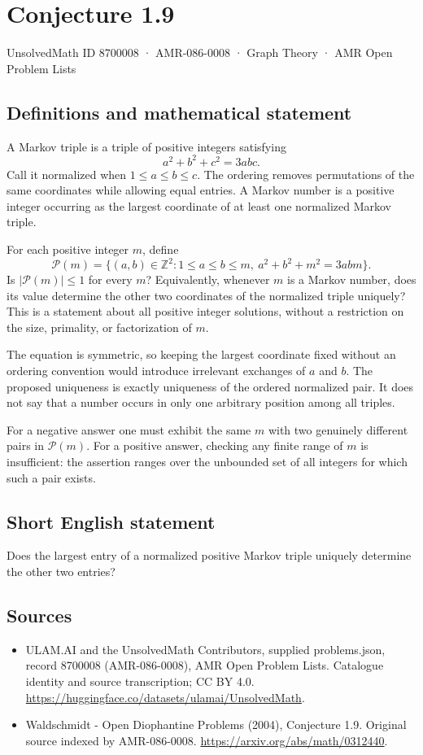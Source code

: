 \documentclass[11pt,a4paper]{article}
\begin{document}
\section*{Conjecture 1.9}\label{8700008}
{\small UnsolvedMath ID 8700008 · AMR-086-0008 · Graph Theory · AMR Open Problem Lists}
\subsection{Definitions and mathematical statement}
A Markov triple is a triple of positive integers satisfying
\[
a^2+b^2+c^2=3abc.
\]
Call it normalized when $1\le a\le b\le c$. The ordering removes permutations of the same coordinates while allowing equal entries. A Markov number is a positive integer occurring as the largest coordinate of at least one normalized Markov triple.

For each positive integer $m$, define
\[
\mathcal P(m)=\{(a,b)\in\mathbb Z^2:1\le a\le b\le m,
\ a^2+b^2+m^2=3abm\}.
\]
Is $|\mathcal P(m)|\le1$ for every $m$? Equivalently, whenever $m$ is a Markov number, does its value determine the other two coordinates of the normalized triple uniquely? This is a statement about all positive integer solutions, without a restriction on the size, primality, or factorization of $m$.

The equation is symmetric, so keeping the largest coordinate fixed without an ordering convention would introduce irrelevant exchanges of $a$ and $b$. The proposed uniqueness is exactly uniqueness of the ordered normalized pair. It does not say that a number occurs in only one arbitrary position among all triples.

For a negative answer one must exhibit the same $m$ with two genuinely different pairs in $\mathcal P(m)$. For a positive answer, checking any finite range of $m$ is insufficient: the assertion ranges over the unbounded set of all integers for which such a pair exists.
\subsection{Short English statement}
Does the largest entry of a normalized positive Markov triple uniquely determine the other two entries?
\subsection{Sources}
\begin{itemize}
\item[S1] ULAM.AI and the UnsolvedMath Contributors, supplied problems.json, record 8700008 (AMR-086-0008), AMR Open Problem Lists. Catalogue identity and source transcription; CC BY 4.0.
\url{https://huggingface.co/datasets/ulamai/UnsolvedMath}.
\item[S2] Waldschmidt - Open Diophantine Problems (2004), Conjecture 1.9. Original source indexed by AMR-086-0008.
\url{https://arxiv.org/abs/math/0312440}.
\end{itemize}
\end{document}

